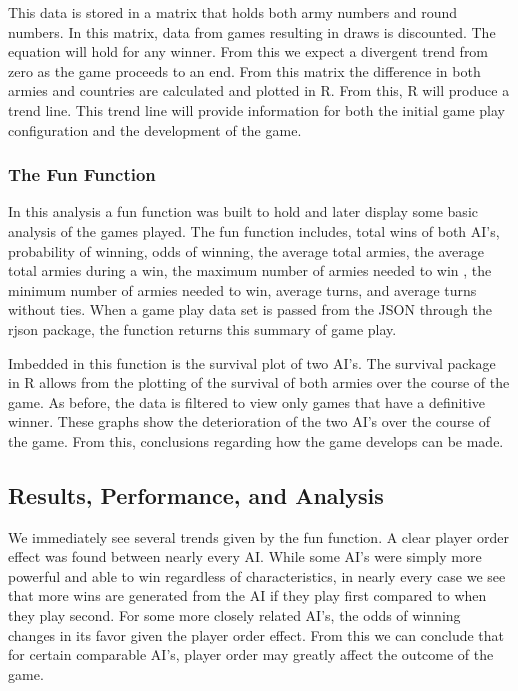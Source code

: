 \documentclass[12pt]{article}  %
\begin{document}
This data is stored in a matrix that holds both army numbers and round numbers. In this matrix, data from games resulting in draws is discounted. The equation will hold for any winner. From this we expect a divergent trend from zero as the game proceeds to an end. From this matrix the difference in both armies and countries are calculated and plotted in R. From this, R will produce a trend line. This trend line will provide information for both the initial game play configuration and the development of the game. 


\subsubsection{The Fun Function}
In this analysis a fun function was built to hold and later display some basic analysis of the games played. The fun function includes, total wins of both AI’s, probability of winning, odds of winning, the average total armies, the average total armies during a win, the maximum number of armies needed to win , the minimum number of armies needed to win, average turns, and average turns without ties. When a game play data set is passed from the JSON through the rjson package, the function returns this summary of game play. 

Imbedded in this function is the survival plot of two AI’s. The survival package in R allows from the plotting of the survival of both armies over the course of the game. As before, the data is filtered to view only games that have a definitive winner. These graphs show the deterioration of the two AI’s over the course of the game. From this, conclusions regarding how the game develops can be made. 



\subsection{Results, Performance, and Analysis }
We immediately see several trends given by the fun function. A clear player order effect was found between nearly every AI. While some AI’s were simply more powerful and able to win regardless of characteristics, in nearly every case we see that more wins are generated from the AI if they play first compared to when they play second. For some more closely related AI’s, the odds of winning changes in its favor given the player order effect. From this we can conclude that for certain comparable AI’s, player order may greatly affect the outcome of the game. 
\end{document}
